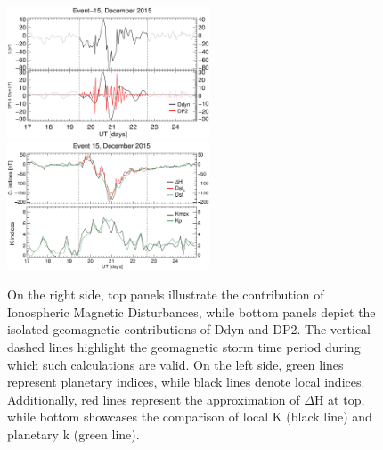 \documentclass[a4paper,fleqn]{cas-dc}
\begin{document}
\begin{figure}[h!]
       \centerline{\Large \bf   
 	\hspace{0.26\textwidth}  \color{black}{}
 	\hspace{0.31\textwidth}  \color{black}{}
 	\hfill}
 \includegraphics[width=6.0cm]{images/diono/iono_PI_V1_2015-12-17.eps}
 \includegraphics[width=6.0cm]{images/dH_approx/diono_valid_V4_2015-12-17.eps}           
       \caption{On the right side, top panels illustrate the contribution of Ionospheric Magnetic Disturbances, while bottom panels depict the isolated geomagnetic contributions of Ddyn and DP2. The vertical dashed lines highlight the geomagnetic storm time period during which such calculations are valid. On the left side, green lines represent planetary indices, while black lines denote local indices. Additionally, red lines represent the approximation of $\Delta$H at top, while bottom showcases the comparison of local K (black line) and planetary k (green line).
       }
    \label{fig:iono_valid2}
\end{figure}
\end{document}
